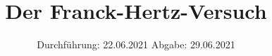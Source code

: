 

\subject{V601}
\title{Der Franck-Hertz-Versuch}
\date{%
  Durchführung: 22.06.2021
  \hspace{3em}
  Abgabe: 29.06.2021
}



\maketitle
\thispagestyle{empty}
\tableofcontents
\newpage







\printbibliography{}


